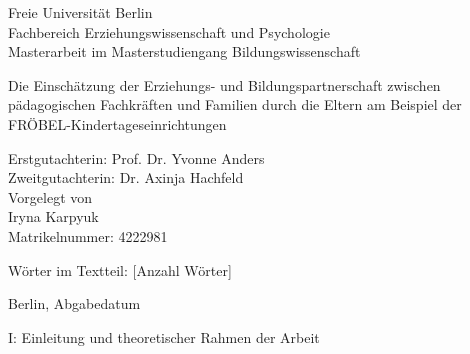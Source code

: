 \documentclass[12pt,a4paper]{article}
\author{}
\title{  }
\begin{document}
\begin{titlepage}

\normalsize

\begin{center}
Freie Universität Berlin \\
Fachbereich Erziehungswissenschaft und Psychologie\\
Masterarbeit im Masterstudiengang Bildungswissenschaft
\end{center}

\vspace{30pt}

\begin{center}
\huge
Die Einschätzung der Erziehungs- und Bildungspartnerschaft zwischen pädagogischen Fachkräften und Familien durch die Eltern am Beispiel der FRÖBEL-Kindertageseinrichtungen\\  
\vspace{50pt}
 \end{center}
                         
\normalsize  
\begin{center}
Erstgutachterin:  Prof. Dr. Yvonne Anders\\
Zweitgutachterin:  Dr. Axinja Hachfeld                             \\
Vorgelegt von\\ 
Iryna Karpyuk \\
Matrikelnummer: 4222981\\
\end{center}                  
Wörter im Textteil: [Anzahl Wörter]\\     

\begin{center}
\normalsize
\vspace{150pt}

Berlin, Abgabedatum
\end{center}
\end{titlepage}
\normalsize                                              
\pagebreak

\begin{abstract}


\end{abstract}

\pagebreak

\tableofcontents
\begin{tiny}
\end{tiny}
\pagebreak

\begin{titlepage}
\end{titlepage}
\vspace*{\fill}
\begin{Huge}\noindent
I: Einleitung und theoretischer Rahmen der Arbeit
\end{Huge}
\vspace*{\fill}
\pagebreak
\end{document}
